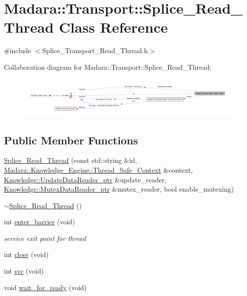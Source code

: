 \hypertarget{classMadara_1_1Transport_1_1Splice__Read__Thread}{
\section{Madara::Transport::Splice\_\-Read\_\-Thread Class Reference}
\label{de/db7/classMadara_1_1Transport_1_1Splice__Read__Thread}
}


{\ttfamily \#include $<$Splice\_\-Transport\_\-Read\_\-Thread.h$>$}



Collaboration diagram for Madara::Transport::Splice\_\-Read\_\-Thread:
\nopagebreak
\begin{figure}[H]
\begin{center}
\leavevmode
\includegraphics[width=400pt]{dc/d9f/classMadara_1_1Transport_1_1Splice__Read__Thread__coll__graph}
\end{center}
\end{figure}
\subsection*{Public Member Functions}
\begin{DoxyCompactItemize}
\item 
\hyperlink{classMadara_1_1Transport_1_1Splice__Read__Thread_a17729538ea8da10ba3716781c90c0bdf}{Splice\_\-Read\_\-Thread} (const std::string \&id, \hyperlink{classMadara_1_1Knowledge__Engine_1_1Thread__Safe__Context}{Madara::Knowledge\_\-Engine::Thread\_\-Safe\_\-Context} \&context, \hyperlink{classKnowledge_1_1UpdateDataReader}{Knowledge::UpdateDataReader\_\-ptr} \&update\_\-reader, \hyperlink{classKnowledge_1_1MutexDataReader}{Knowledge::MutexDataReader\_\-ptr} \&mutex\_\-reader, bool enable\_\-mutexing)
\item 
\hyperlink{classMadara_1_1Transport_1_1Splice__Read__Thread_a85350aae8f80457b444a2abd1cfc15d3}{$\sim$Splice\_\-Read\_\-Thread} ()
\item 
int \hyperlink{classMadara_1_1Transport_1_1Splice__Read__Thread_a8ba76a5d234a10111a708e923fdd42b3}{enter\_\-barrier} (void)
\begin{DoxyCompactList}\small\item\em service exit point for thread \item\end{DoxyCompactList}\item 
int \hyperlink{classMadara_1_1Transport_1_1Splice__Read__Thread_aa9aec995a38ee960b3630f14e7b0e1aa}{close} (void)
\item 
int \hyperlink{classMadara_1_1Transport_1_1Splice__Read__Thread_a152795c3853303d001e7e45c8ab5ac55}{svc} (void)
\item 
void \hyperlink{classMadara_1_1Transport_1_1Splice__Read__Thread_a2696c23b93bac4b2bca110ac12a70845}{wait\_\-for\_\-ready} (void)
\end{DoxyCompactItemize}
